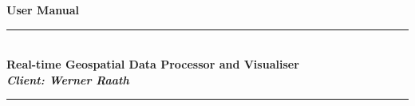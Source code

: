 \documentclass[a4paper,12pt]{article}
\begin{document}
	
\begin{titlepage}
	\newcommand{\HRule}{\rule{\linewidth}{0.5mm}} %

	\center %
	 
	

	
	{ \huge \bfseries User Manual}\\\HRule \\[0.4cm] %
	\Large \textbf{Real-time Geospatial Data Processor and Visualiser} \\
	\small \emph{\textbf{Client: Werner Raath}}
	\HRule \\[1.5cm]
	 

\end{titlepage}
\end{document}
